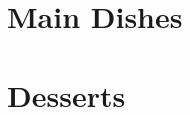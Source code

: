 \documentclass{report}
\begin{document}
\frontmatter

\newpage
\chead{} 
\tableofcontents %




\mainmatter
    \chapter{Main Dishes} %
    \chapter{Desserts}
        
    
\end{document}
